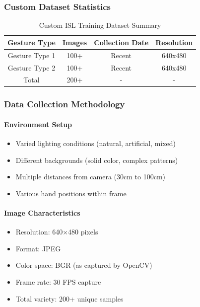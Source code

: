 \subsubsection{Custom Dataset Statistics}

\begin{table}[H]
\centering
\begin{tabular}{|c|c|c|c|}
\hline
\textbf{Gesture Type} & \textbf{Images} & \textbf{Collection Date} & \textbf{Resolution} \\
\hline
Gesture Type 1 & 100+ & Recent & 640x480 \\
\hline
Gesture Type 2 & 100+ & Recent & 640x480 \\
\hline
Total & 200+ & - & - \\
\hline
\end{tabular}
\caption{Custom ISL Training Dataset Summary}
\end{table}

\subsubsection{Data Collection Methodology}

\paragraph{Environment Setup}
\begin{itemize}
    \item Varied lighting conditions (natural, artificial, mixed)
    \item Different backgrounds (solid color, complex patterns)
    \item Multiple distances from camera (30cm to 100cm)
    \item Various hand positions within frame
\end{itemize}

\paragraph{Image Characteristics}
\begin{itemize}
    \item Resolution: 640×480 pixels
    \item Format: JPEG
    \item Color space: BGR (as captured by OpenCV)
    \item Frame rate: 30 FPS capture
    \item Total variety: 200+ unique samples
\end{itemize}

